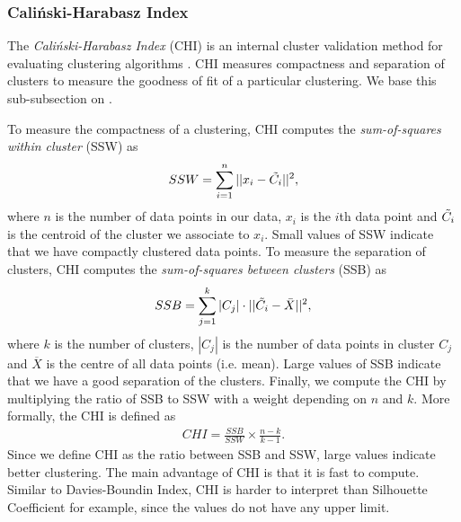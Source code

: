 \subsubsection{Caliński-Harabasz Index}
\label{sec:calinski-harabasz-index}
The \textit{Caliński-Harabasz Index} (CHI) is an internal cluster validation method for evaluating clustering algorithms \cite{CalinskiHarabasz1974}. CHI measures compactness and separation of clusters to measure the goodness of fit of a particular clustering. We base this sub-subsection on \cite{CalinskiHarabasz1974}.

To measure the compactness of a clustering, CHI computes the \textit{sum-of-squares within cluster} (SSW) as
\begin{align}
    SSW = \sum\limits_{i=1}^{n} ||x_i - \Tilde{C_i}||^2,
    \label{eqn:chi-ssw}
\end{align}
where $n$ is the number of data points in our data, $x_i$ is the $i$th data point and $\Tilde{C_i}$ is the centroid of the cluster we associate to $x_i$. Small values of SSW indicate that we have compactly clustered data points. To measure the separation of clusters, CHI computes the \textit{sum-of-squares between clusters} (SSB) as
\begin{align}
    SSB = \sum\limits_{j=1}^{k} |C_j| \cdot ||\Tilde{C_i} - \Bar{X}||^2,
    \label{eqn:chi-ssb}
\end{align}
where $k$ is the number of clusters, $|C_j|$ is the number of data points in cluster $C_j$ and $\overline{X}$ is the centre of all data points (i.e. mean). Large values of SSB indicate that we have a good separation of the clusters. Finally, we compute the CHI by multiplying the ratio of SSB to SSW with a weight depending on $n$ and $k$. More formally, the CHI is defined as
\begin{align}
    CHI = \frac{SSB}{SSW} \times \frac{n - k}{k - 1}.
    \label{eqn:chi}
\end{align}
Since we define CHI as the ratio between SSB and SSW, large values indicate better clustering. The main advantage of CHI is that it is fast to compute. Similar to Davies-Boundin Index, CHI is harder to interpret than Silhouette Coefficient for example, since the values do not have any upper limit.

